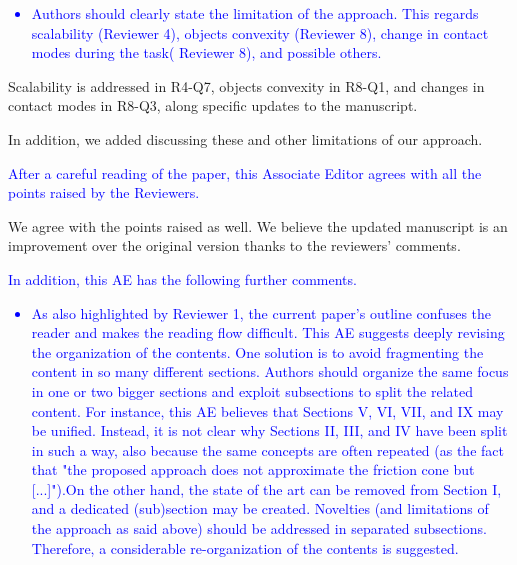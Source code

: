\textcolor{blue}{
\begin{itemize}
    \item Authors should clearly state the limitation of the approach. This
regards scalability (Reviewer 4), objects convexity (Reviewer 8), change in
contact modes during the task( Reviewer 8), and possible others. \end{itemize}}

Scalability is addressed in R4-Q7, objects convexity in R8-Q1, and changes in
contact modes in R8-Q3, along specific updates to the manuscript.

In addition, we added  discussing these and other
limitations of our approach.


\vspace{5mm}
\textcolor{blue}{After a careful reading of the paper, this Associate Editor
agrees with all the points raised by the Reviewers.}

We agree with the points raised as well. We believe the updated manuscript is an
improvement over the original version thanks to the reviewers' comments.

\vspace{5mm}
\textcolor{blue}{In addition, this AE has the following further comments.}
\textcolor{blue}{
\begin{itemize}
    \item As also highlighted by Reviewer 1, the current paper's outline
confuses the reader and makes the reading flow difficult. This AE suggests
deeply revising the organization of the contents. One solution is to avoid
fragmenting the content in so many different sections. Authors should organize
the same focus in one or two bigger sections and exploit subsections to split
the related content. For instance, this AE believes that Sections V, VI, VII,
and IX may be unified. Instead, it is not clear why Sections II, III, and IV
have been split in such a way, also because the same concepts are often repeated
(as the fact that "the proposed approach does not approximate the friction cone
but [...]").On the other hand, the state of the art can be removed from Section
I, and a dedicated (sub)section may be created. Novelties (and limitations of
the approach as said above) should be addressed in separated subsections.
Therefore, a considerable re-organization of the contents is suggested.
\end{itemize}}

